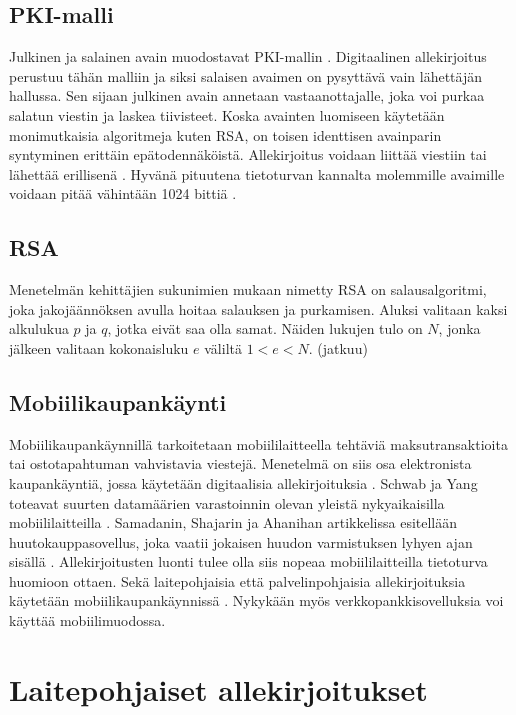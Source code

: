 \documentclass[finnish]{tktltiki2}
\theoremstyle{definition}
\theoremstyle{remark}
\begin{document}
\subsection{PKI-malli}

Julkinen ja salainen avain muodostavat PKI-mallin \cite{ECC}. Digitaalinen allekirjoitus perustuu tähän malliin ja siksi salaisen avaimen on pysyttävä vain lähettäjän hallussa. Sen sijaan julkinen avain annetaan vastaanottajalle, joka voi purkaa salatun viestin ja laskea tiivisteet. Koska avainten luomiseen käytetään monimutkaisia algoritmeja kuten RSA, on toisen identtisen avainparin syntyminen erittäin epätodennäköistä. Allekirjoitus voidaan liittää viestiin tai lähettää erillisenä \cite{moen}. Hyvänä pituutena tietoturvan kannalta molemmille avaimille voidaan pitää vähintään 1024 bittiä \cite{ECC}. 

\subsection{RSA}

Menetelmän kehittäjien sukunimien mukaan nimetty RSA on salausalgoritmi, joka jakojäännöksen avulla hoitaa salauksen ja purkamisen. Aluksi valitaan kaksi alkulukua $p$ ja $q$, jotka eivät saa olla samat. Näiden lukujen tulo on $N$, jonka jälkeen valitaan kokonaisluku $e$ väliltä $1 < e < N$. (jatkuu)

\subsection{Mobiilikaupankäynti}

Mobiilikaupankäynnillä tarkoitetaan mobiililaitteella tehtäviä maksutransaktioita tai ostotapahtuman vahvistavia viestejä. Menetelmä on siis osa elektronista kaupankäyntiä, jossa käytetään digitaalisia allekirjoituksia \cite{e-c}. Schwab ja Yang toteavat suurten datamäärien varastoinnin olevan yleistä nykyaikaisilla mobiililaitteilla \cite{enti}. Samadanin, Shajarin ja Ahanihan artikkelissa esitellään huutokauppasovellus, joka vaatii jokaisen huudon varmistuksen lyhyen ajan sisällä \cite{proxy}. Allekirjoitusten luonti tulee olla siis nopeaa mobiililaitteilla tietoturva huomioon ottaen. Sekä laitepohjaisia että palvelinpohjaisia allekirjoituksia käytetään mobiilikaupankäynnissä \cite{proxy}. Nykykään myös verkkopankkisovelluksia voi käyttää mobiilimuodossa.

\section{Laitepohjaiset allekirjoitukset}
\end{document}
